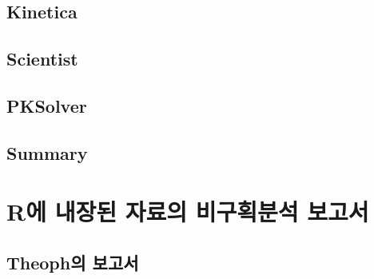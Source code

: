 \documentclass[
  12pt,
]{krantz}
\begin{document}
\hypertarget{kinetica}{%
\section{Kinetica}\label{kinetica}}

\hypertarget{scientist}{%
\section{Scientist}\label{scientist}}

\hypertarget{pksolver}{%
\section{PKSolver}\label{pksolver}}

\hypertarget{summary}{%
\section{Summary}\label{summary}}

\hypertarget{groupreport}{%
\chapter{R에 내장된 자료의 비구획분석 보고서}\label{groupreport}}

\hypertarget{theophgroup}{%
\section{Theoph의 보고서}\label{theophgroup}}
\end{document}
